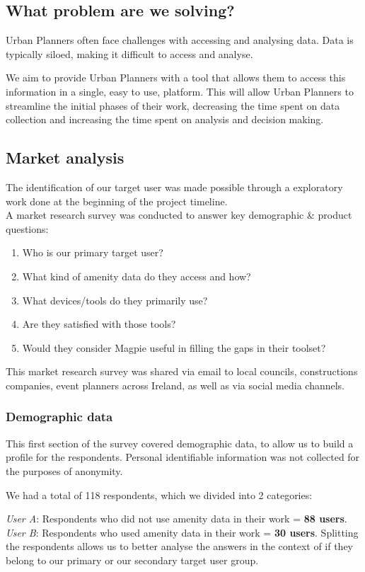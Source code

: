 \subsection{What problem are we solving?}
Urban Planners often face challenges with accessing and analysing data. Data is
typically siloed, making it difficult to access and analyse.

We aim to provide Urban Planners with a tool that allows them to access this
information in a single, easy to use, platform. This will allow Urban Planners
to streamline the initial phases of their work, decreasing the time spent on
data collection and increasing the time spent on analysis and decision making.

\subsection{Market analysis}
The identification of our target user was made possible through a exploratory work done at the beginning of the project timeline.\\
A market research survey was conducted to answer key demographic \& product questions:
\begin{enumerate}
    \item Who is our primary target user?
    \item What kind of amenity data do they access and how?
    \item What devices/tools do they primarily use?
    \item Are they satisfied with those tools?
    \item Would they consider Magpie useful in filling the gaps in their toolset?
\end{enumerate}
This market research survey was shared via email to local councils, constructions companies, event planners across Ireland, as well as via social media channels.

\subsubsection{Demographic data}
This first section of the survey covered demographic data, to allow us to build a profile for the respondents. Personal identifiable information was not collected for the purposes of anonymity.

We had a total of 118 respondents, which we divided into 2 categories:

\emph{User A}: Respondents who did not use amenity data in their work = \textbf{88 users}.
\emph{User B}: Respondents who used amenity data in their work = \textbf{30 users}.
Splitting the respondents allows us to better analyse the answers in the context of if they belong to our primary or our secondary target user group.


